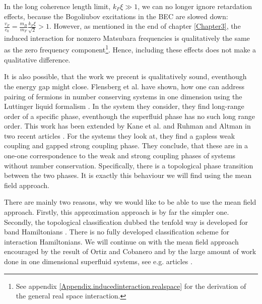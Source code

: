 In the long coherence length limit, $k_F\xi \gg 1$, we can no longer ignore retardation effects, because the Bogoliubov excitations in the BEC are slowed down: $\frac{v_F}{c_0} = \frac{m_B}{m_F}\frac{k_F\xi}{\sqrt{2}} > 1$. However, as mentioned in the end of chapter \ref{Chapter3}, the induced interaction for nonzero Matsubara frequencies is qualitatively the same as the zero frequency component\footnote{See appendix \ref{Appendix.inducedinteraction.realspace} for the derivation of the general real space interaction.}. Hence, including these effects does not make a qualitative difference.

It is also possible, that the work we precent is qualitatively sound, eventhough the energy gap might close. Flensberg et al. have shown, how one can address pairing of fermions in number conserving systems in one dimension using the Luttinger liquid formalism \cite{Flensberg.numberconserving1Dfermions}. In the system they consider, they find long-range order of a specific phase, eventhough the superfluid phase has no such long range order. This work has been extended by Kane et al. and Ruhman and Altman in two recent articles \cite{Kane.Pairing.Luttingerliquids, Altman.Pairing.spinlessfermions}. For the systems they look at, they find a gapless weak coupling and gapped strong coupling phase. They conclude, that these are in a one-one correspondence to the weak and strong coupling phases of systems without number conservation. Specifically, there is a topological phase transition between the two phases. It is exactly this behaviour we will find using the mean field approach.

There are mainly two reasons, why we would like to be able to use the mean field approach. Firstly, this approximation approach is by far the simpler one. Secondly, the topological classification dubbed the tenfold way is developed for band Hamiltonians \cite{Ryu.Topology}. There is no fully developed classification scheme for interaction Hamiltonians. We will continue on with the mean field approach encouraged by the result of Ortiz and Cobanero and by the large amount of work done in one dimensional superfluid systems, see e.g. articles \cite{Alicea, KitaevTopPhases, KitaevQuantumWires, LiYangChen, FuKane2006, GreiterIsingKitaevChain, DeGottardiMajoranaFermions, BudichTopInvMajoranaWires}. 

